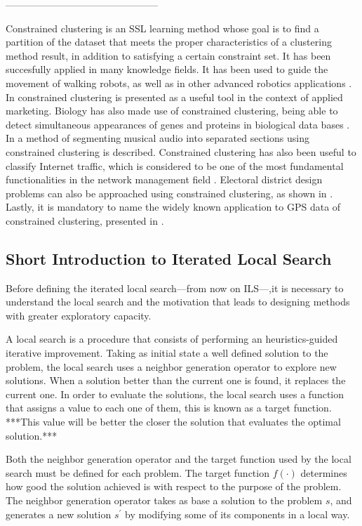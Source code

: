 -----------------------------------------------


Constrained clustering is an SSL learning method whose goal is to find a partition of the dataset that meets the proper characteristics of a clustering method result, in addition to satisfying a certain constraint set. It has been succesfully applied in many knowledge fields. It has been used to guide the movement of walking robots, as well as in other advanced robotics applications \cite{davidson2005clustering, semnani2016constrained}. In \cite{seret2014new} constrained clustering is presented as a useful tool in the context of applied marketing. Biology has also made use of constrained clustering, being able to detect simultaneous appearances of genes and proteins in biological data bases \cite{segal2003discovering}. In \cite{levy2008structural} a method of segmenting musical audio into separated sections using constrained clustering is described. Constrained clustering has also been useful to classify Internet traffic, which is considered to be one of the most fundamental functionalities in the network management field \cite{wang2014internet}. Electoral district design problems can also be approached using constrained clustering, as shown in \cite{brieden2017constrained}. Lastly, it is mandatory to name the widely known application to GPS data of constrained clustering, presented in \cite{wagstaff2001constrained}.

\subsection{Short Introduction to Iterated Local Search}

Before defining the iterated local search---from now on ILS---,it is necessary to understand the local search and the motivation that leads to designing methods with greater exploratory capacity.

A local search is a procedure that consists of performing an heuristics-guided iterative improvement. Taking as initial state a well defined solution to the problem, the local search uses a neighbor generation operator to explore new solutions. When a solution better than the current one is found, it replaces the current one. In order to evaluate the solutions, the local search uses a function that assigns a value to each one of them, this is known as a target function. ***This value will be better the closer the solution that evaluates the optimal solution.*** 

Both the neighbor generation operator and the target function used by the local search must be defined for each problem. The target function $f(\cdot)$ determines how good the solution achieved is with respect to the purpose of the problem. The neighbor generation operator takes as base a solution to the problem $s$, and generates a new solution $s^\prime$ by modifying some of its components in a local way.

